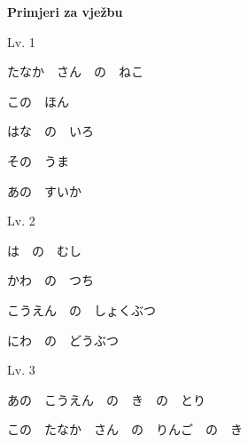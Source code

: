 	\begin{reibun}
	\end{reibun}
		

	\normalsize \textbf{Primjeri za vježbu}
	
	\begin{mondai}{Lv. 1}
		\item たなか　さん　の　ねこ
		\item この　ほん
		\item はな　の　いろ
		\item その　うま
		\item あの　すいか
	\end{mondai}
	
	\begin{mondai}{Lv. 2}
		\item は　の　むし
		\item かわ　の　つち
		\item こうえん　の　しょくぶつ
		\item にわ　の　どうぶつ
	\end{mondai}
	
	\begin{mondai}{Lv. 3}
		\item あの　こうえん　の　き　の　とり
		\item この　たなか　さん　の　りんご　の　き
	\end{mondai}
	



